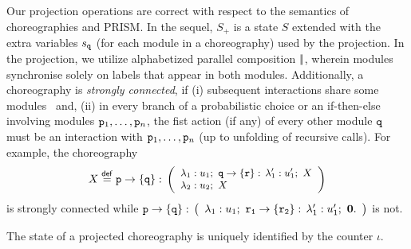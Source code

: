  Our projection operations are correct with
respect to the semantics of choreographies and PRISM. In the sequel,
$S_+$ is a state $S$ extended with the extra variables $s_{\mathtt{q}}$
(for each module in a choreography) used by the projection. In the
projection, we utilize alphabetized parallel composition $|\!|$,
wherein modules synchronise solely on labels that appear in both
modules.
Additionally, a choreography is {\em strongly connected},  
%
if (i) subsequent interactions share some modules~\cite{CHY12} and,
%
(ii) in every branch of a probabilistic choice or an if-then-else
involving modules $\mathtt{p}_1, \ldots, \mathtt{p}_n$, the fist action (if
any) of every other module $\mathtt{q}$ must be an interaction with
$\mathtt{p}_1, \ldots, \mathtt{p}_n$ (up to unfolding of recursive
calls). For example, the choreography
%
\begin{displaymath}\small
  X\stackrel{\mathsf{def}}{=} 
  \mathtt{p}\rightarrow \{\mathtt{q}\}:\,
  \left(
    \begin{array}{l}
      \lambda_1: u_1;\ \mathtt{q}\rightarrow \{\mathtt{r}\}:\, \lambda_1':u_1';\ X    \\
      \lambda_2: u_2;\ X
    \end{array}
  \right)
\end{displaymath}
%
is strongly connected while 
% 
$%
\interactBase{p}{q}:\,
\left(
  \begin{array}{l}
    \lambda_1: u_1;\ \interactBase{r_1}{r_2}:\, \lambda_1':u_1';\ \CEnd.
  \end{array}
\right) $ is not.
% 



\begin{lemma}
  The state of a projected choreography is uniquely identified by the
  counter $\iota$.
\end{lemma}

